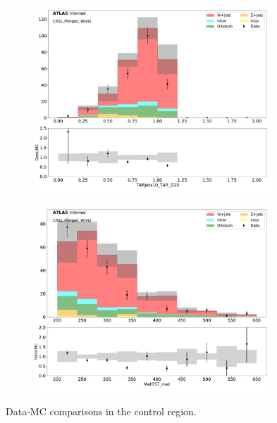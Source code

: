\begin{figure}[htbp]
\begin{subfigure}{0.49\textwidth}
     \includegraphics[width = 0.98\textwidth]{Figures/4/datamc/CR1L_Merged_WJets/TARJets10_TAR_D20.pdf}
     \caption{\DtwoTAR}
     \end{subfigure}
     \begin{subfigure}{0.49\textwidth}
     \includegraphics[width = 0.98\textwidth]{Figures/4/datamc/CR1L_Merged_WJets/MetTST_met.pdf}
     \caption{\met}
     \end{subfigure}

     \caption{Data-MC comparisons in the \merged \wjets control region.}
     \label{fig:Data_MC_CRdR_merged}
  \end{figure}

